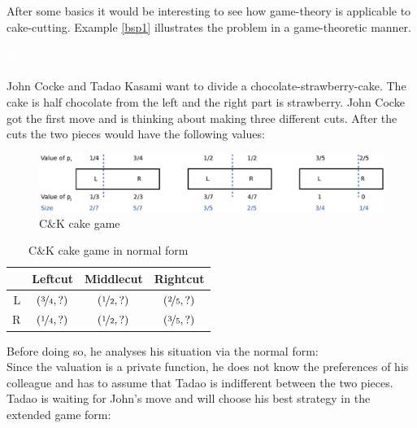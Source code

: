 After some basics it would be interesting to see how game-theory is applicable to cake-cutting. Example \ref{bsp1} illustrates the problem in a game-theoretic manner.
\begin{bsp}
\label{bsp1}
\textcolor{white}{x}\\\\
John Cocke and Tadao Kasami want to divide a chocolate-strawberry-cake. The cake is half chocolate from the left and the right part is strawberry. John Cocke got the first move and is thinking about making three different cuts. After the cuts the two pieces would have the following values:
	\begin{figure}[!h]
		\centering
 		 \includegraphics[width=390pt]{bilder/ex1.pdf}
   \caption{C$\&$K cake game}
  	 \end{figure}
  	 \newline
\begin{table}[htb]
\centering
 \renewcommand{\arraystretch}{1.2} 
\begin{tabular}{c|c|c|c|}
\cline{2-4}
&\multicolumn{1}{|c|}{{Leftcut}}& {Middlecut}&{Rightcut}\\
\hline
\multicolumn{1}{|r|}{{L}}&$\left(\nicefrac{3}{4}, ?\right)$&$\left(\nicefrac{1}{2}, ?\right)$&$\left(\nicefrac{2}{5}, ?\right)$\\
\hline
\multicolumn{1}{|r|}{{R}}&$\left(\nicefrac{1}{4}, ?\right)$&$\left(\nicefrac{1}{2}, ?\right)$&$\left(\nicefrac{3}{5}, ?\right)$\\
\hline
\end{tabular}
\caption{C$\&$K cake game in normal form}\label{Table1}
\end{table}
Before doing so, he analyses his situation via the normal form:\\Since the valuation is a private function, he does not know the preferences of his colleague and has to assume that Tadao is indifferent between the two pieces. %
Tadao is waiting for John's move and will choose his best strategy in the extended game form: 

\end{bsp}
